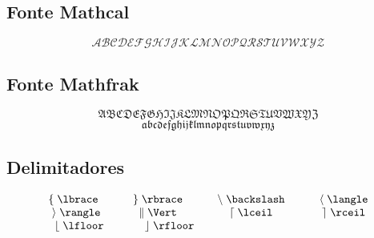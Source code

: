 \subsection{Fonte Mathcal}
\begin{equation*}
    \mathcal{A}\mathcal{B}\mathcal{C}\mathcal{D}\mathcal{E}\mathcal{F}\mathcal{G}\mathcal{H}\mathcal{I}\mathcal{J}\mathcal{K}\mathcal{L}\mathcal{M}\mathcal{N}\mathcal{O}\mathcal{P}\mathcal{Q}\mathcal{R}\mathcal{S}\mathcal{T}\mathcal{U}\mathcal{V}\mathcal{W}\mathcal{X}\mathcal{Y}\mathcal{Z}
\end{equation*}

\subsection{Fonte Mathfrak}
\begin{equation*}
    \mathfrak{A}\mathfrak{B}\mathfrak{C}\mathfrak{D}\mathfrak{E}\mathfrak{F}\mathfrak{G}\mathfrak{H}\mathfrak{I}\mathfrak{J}\mathfrak{K}\mathfrak{L}\mathfrak{M}\mathfrak{N}\mathfrak{O}\mathfrak{P}\mathfrak{Q}\mathfrak{R}\mathfrak{S}\mathfrak{T}\mathfrak{U}\mathfrak{V}\mathfrak{W}\mathfrak{X}\mathfrak{Y}\mathfrak{Z}
\end{equation*}
\begin{equation*}
    \mathfrak{a}\mathfrak{b}\mathfrak{c}\mathfrak{d}\mathfrak{e}\mathfrak{f}\mathfrak{g}\mathfrak{h}\mathfrak{i}\mathfrak{j}\mathfrak{k}\mathfrak{l}\mathfrak{m}\mathfrak{n}\mathfrak{o}\mathfrak{p}\mathfrak{q}\mathfrak{r}\mathfrak{s}\mathfrak{t}\mathfrak{u}\mathfrak{v}\mathfrak{w}\mathfrak{x}\mathfrak{y}\mathfrak{z}
\end{equation*}

\subsection{Delimitadores}
\begin{equation*}
    \begin{matrix}
        \lbrace \; \verb|\lbrace    | & \rbrace \; \verb|\rbrace    | &  \backslash \; \verb|\backslash    | & \langle \; \verb|\langle| \\
        \rangle \; \verb|\rangle   | & \Vert \; \verb|\Vert    | & \lceil \; \verb|\lceil    | & \rceil \; \verb|\rceil| \\
        \lfloor \; \verb|\lfloor  | & \rfloor \; \verb|\rfloor| & &
    \end{matrix}
\end{equation*}

